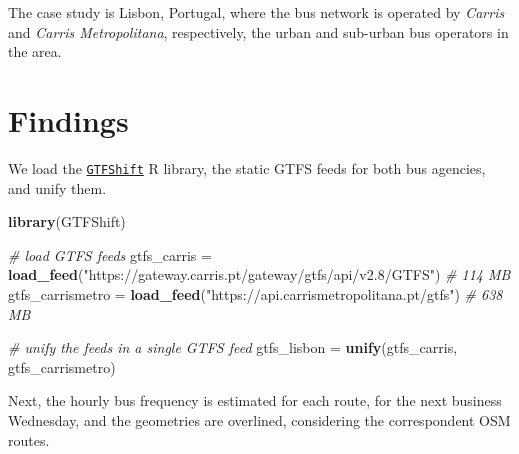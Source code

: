 \documentclass[
]{article}
\newenvironment{Shaded}{\begin{snugshade}}{\end{snugshade}}
\newcommand{\CommentTok}[1]{\textcolor[rgb]{0.56,0.35,0.01}{\textit{#1}}}
\newcommand{\FunctionTok}[1]{\textcolor[rgb]{0.13,0.29,0.53}{\textbf{#1}}}
\newcommand{\NormalTok}[1]{#1}
\newcommand{\OtherTok}[1]{\textcolor[rgb]{0.56,0.35,0.01}{#1}}
\newcommand{\StringTok}[1]{\textcolor[rgb]{0.31,0.60,0.02}{#1}}
\begin{document}
The case study is Lisbon, Portugal, where the bus network is operated by \emph{Carris} and \emph{Carris Metropolitana}, respectively, the urban and sub-urban bus operators in the area.

\section{Findings}\label{findings}

We load the \href{https://u-shift.github.io/GTFShift/}{\texttt{GTFShift}} R library, the static GTFS feeds for both bus agencies, and unify them.

\begin{Shaded}
\begin{Highlighting}[]
\FunctionTok{library}\NormalTok{(GTFShift)}

\CommentTok{\# load GTFS feeds}
\NormalTok{gtfs\_carris }\OtherTok{=} \FunctionTok{load\_feed}\NormalTok{(}\StringTok{"https://gateway.carris.pt/gateway/gtfs/api/v2.8/GTFS"}\NormalTok{) }\CommentTok{\# 114 MB}
\NormalTok{gtfs\_carrismetro }\OtherTok{=} \FunctionTok{load\_feed}\NormalTok{(}\StringTok{"https://api.carrismetropolitana.pt/gtfs"}\NormalTok{) }\CommentTok{\# 638 MB}
\end{Highlighting}
\end{Shaded}

\begin{Shaded}
\begin{Highlighting}[]
\CommentTok{\# unify the feeds in a single GTFS feed}
\NormalTok{gtfs\_lisbon }\OtherTok{=} \FunctionTok{unify}\NormalTok{(gtfs\_carris, gtfs\_carrismetro)}
\end{Highlighting}
\end{Shaded}

Next, the hourly bus frequency is estimated for each route, for the next business Wednesday, and the geometries are overlined, considering the correspondent OSM routes.
\end{document}

